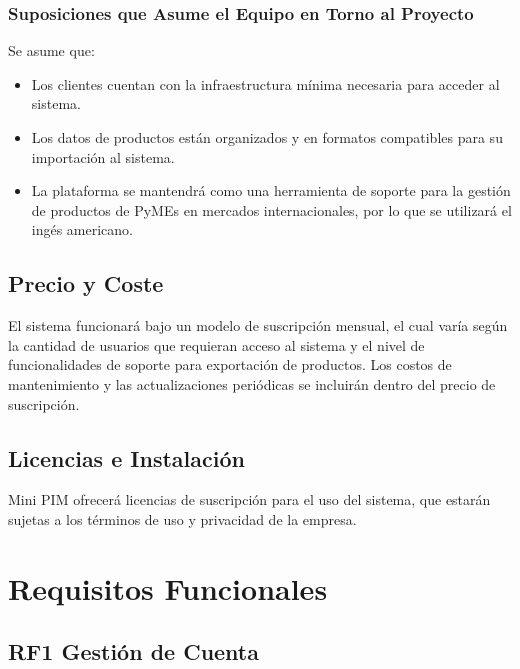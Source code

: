 \documentclass{article}
\begin{document}
\subsubsection{Suposiciones que Asume el Equipo en Torno al Proyecto}
Se asume que:
\begin{itemize}
    \item Los clientes cuentan con la infraestructura mínima necesaria para acceder al sistema.
    \item Los datos de productos están organizados y en formatos compatibles para su importación al sistema.
    \item La plataforma se mantendrá como una herramienta de soporte para la gestión de productos de PyMEs en mercados internacionales, por lo que se utilizará el ingés americano.
\end{itemize}

\subsection{Precio y Coste}
El sistema funcionará bajo un modelo de suscripción mensual, el cual varía según la cantidad de usuarios que requieran acceso al sistema y el nivel de funcionalidades de soporte para exportación de productos. Los costos de mantenimiento y las actualizaciones periódicas se incluirán dentro del precio de suscripción.

\subsection{Licencias e Instalación}
Mini PIM ofrecerá licencias de suscripción para el uso del sistema, que estarán sujetas a los términos de uso y privacidad de la empresa.
\section{Requisitos Funcionales}
\subsection*{RF1 Gestión de Cuenta}
\end{document}

